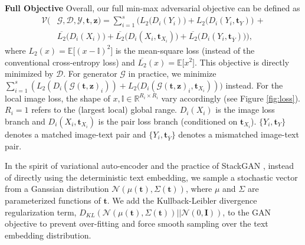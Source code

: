 \documentclass[10pt,twocolumn,letterpaper]{article}
\begin{document}
\textbf{Full Objective } Overall, our full min-max adversarial objective can be defined as 
\vspace{-.2cm}
\begin{equation}
\begin{split}
\mathcal{V}(& \mathcal{G},\mathcal{D}, \mathcal{Y}, \bm t, \bm z) = \sum_{i=1}^{s} \Big(  L_2\big(D_i({Y}_i)\big) +  L_2\big(D_i({Y}_i, \bm t_{Y})\big) \, + \\ 
& \overline{L_2}\big(D_i({X}_i)\big)  + \overline{L_2}\big(D_i({X}_i, \bm{t}_{X_i})\big) + \overline{L_2}\big(D_i({Y}_i,  \bm{t}_{\overline{Y}})\big) \Big),
\end{split}
\end{equation}
where $L_2(x) = \mathbb{E}\big[(x - \mathbb{I})^2\big]$ is the mean-square loss (instead of the conventional cross-entropy loss) and $\overline{L_2}(x) =\mathbb{E}\big[x^2\big]$. 
This objective is directly minimized by $\mathcal{D}$. For generator $\mathcal{G}$ in practice, we minimize 
$\sum_{i=1}^{s} (L_2(D_i(\mathcal{G}(\bm t, \bm z)_i)) +  L_2\big(D_i(\mathcal{G}(\bm t, \bm z)_i, \bm{t}_{X_i})))$ instead.
For the local image loss, the shape of $x, \mathbb{I} \in \mathbb{R}^{R_i{\times}R_i}$ vary accordingly (see Figure \ref{fig:loss}). $R_i=1$ refers to the (largest local) global range. $D_i(X_i)$ is the image loss branch and $D_i(X_i, \bm{t}_{X_i})$ is the pair loss branch (conditioned on $\bm{t}_{X_i}$).
$\{Y_i, \bm t_{Y}\}$ denotes a matched image-text pair and $\{Y_i, \bm{t}_{\overline{Y}}\}$ denotes a mismatched image-text pair. 

In the spirit of variational auto-encoder \cite{vae} and the practice of StackGAN \cite{han2017stackgan}, instead of directly using the deterministic text embedding, we sample a stochastic vector from a Ganssian distribution $\mathcal{N}(\mu({\bm t}), \Sigma({\bm t}))$, where $\mu$ and $\Sigma$ are parameterized functions of $\bm t$. 
We add the Kullback-Leibler divergence regularization term, $D_{KL}(\mathcal{N}(\mu({\bm t}), \Sigma({\bm t}) )|| \mathcal{N}(0, \bm{I}))$, to the GAN objective to prevent over-fitting and force smooth sampling over the text embedding distribution. 

\end{document}
